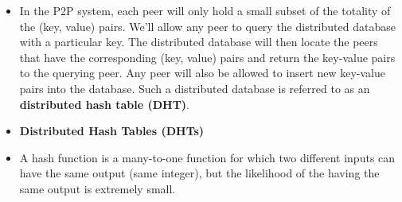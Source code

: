 \begin{itemize}
\item
In the P2P system, each peer will only hold a small subset of the totality of the (key, value) pairs. We'll allow any peer to query the distributed database with a particular key. The distributed database will then locate the peers that have the corresponding (key, value) pairs and return the key-value pairs to the querying peer. Any peer will also be allowed to insert new key-value pairs into the database. Such a distributed database is referred to as an \textbf{distributed hash table (DHT)}.

\item
\textbf{Distributed Hash Tables (DHTs)}

\item
A hash function is a many-to-one function for which two different inputs can have the same output (same integer), but the likelihood of the having the same output is extremely small.

\end{itemize}